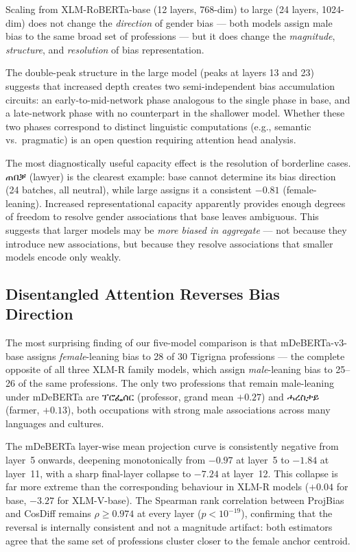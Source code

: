 \documentclass[11pt,a4paper]{article}
\begin{document}
Scaling from XLM-RoBERTa-base (12 layers, 768-dim) to large (24 layers, 1024-dim)
does not change the \emph{direction} of gender bias — both models assign male
bias to the same broad set of professions — but it does change the
\emph{magnitude}, \emph{structure}, and \emph{resolution} of bias representation.

The double-peak structure in the large model (peaks at layers 13 and 23)
suggests that increased depth creates two semi-independent bias accumulation
circuits: an early-to-mid-network phase analogous to the single phase in base,
and a late-network phase with no counterpart in the shallower model. Whether
these two phases correspond to distinct linguistic computations (e.g.,
semantic vs.\ pragmatic) is an open question requiring attention head analysis.

The most diagnostically useful capacity effect is the resolution of borderline
cases. {\ethiopicfont ጠበቓ} (lawyer) is the clearest example: base cannot determine
its bias direction (24 batches, all neutral), while large assigns it a
consistent $-0.81$ (female-leaning). Increased representational capacity
apparently provides enough degrees of freedom to resolve gender associations
that base leaves ambiguous. This suggests that larger models may be
\emph{more biased in aggregate} — not because they introduce new associations,
but because they resolve associations that smaller models encode only weakly.

\subsection{Disentangled Attention Reverses Bias Direction}
\label{sec:deberta_reversal}

The most surprising finding of our five-model comparison is that
mDeBERTa-v3-base assigns \emph{female}-leaning bias to 28 of 30 Tigrigna
professions — the complete opposite of all three XLM-R family models, which
assign \emph{male}-leaning bias to 25--26 of the same professions. The only
two professions that remain male-leaning under mDeBERTa are
{\ethiopicfont ፕሮፌሰር} (professor, grand mean $+0.27$) and {\ethiopicfont ሓረስታይ}
(farmer, $+0.13$), both occupations with strong male associations across many
languages and cultures.

The mDeBERTa layer-wise mean projection curve is consistently negative from
layer~5 onwards, deepening monotonically from $-0.97$ at layer~5 to $-1.84$
at layer~11, with a sharp final-layer collapse to $-7.24$ at layer~12. This
collapse is far more extreme than the corresponding behaviour in XLM-R models
($+0.04$ for base, $-3.27$ for XLM-V-base). The Spearman rank correlation
between ProjBias and CosDiff remains $\rho \geq 0.974$ at every layer
($p < 10^{-19}$), confirming that the reversal is internally consistent and
not a magnitude artifact: both estimators agree that the same set of professions
cluster closer to the female anchor centroid.
\end{document}
